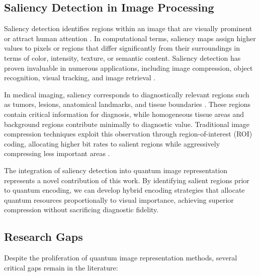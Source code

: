 \documentclass{ipol}
\begin{document}
\subsection{Saliency Detection in Image Processing}

Saliency detection identifies regions within an image that are visually prominent or attract human attention \cite{bib26,bib27,bib28,bib29,bib30,bib31}. In computational terms, saliency maps assign higher values to pixels or regions that differ significantly from their surroundings in terms of color, intensity, texture, or semantic content. Saliency detection has proven invaluable in numerous applications, including image compression, object recognition, visual tracking, and image retrieval \cite{bib32,bib33,bib34,bib35}.

In medical imaging, saliency corresponds to diagnostically relevant regions such as tumors, lesions, anatomical landmarks, and tissue boundaries \cite{bib36,bib37,bib38,bib39,bib40}. These regions contain critical information for diagnosis, while homogeneous tissue areas and background regions contribute minimally to diagnostic value. Traditional image compression techniques exploit this observation through region-of-interest (ROI) coding, allocating higher bit rates to salient regions while aggressively compressing less important areas \cite{bib41}.

The integration of saliency detection into quantum image representation represents a novel contribution of this work. By identifying salient regions prior to quantum encoding, we can develop hybrid encoding strategies that allocate quantum resources proportionally to visual importance, achieving superior compression without sacrificing diagnostic fidelity.

\subsection{Research Gaps}

Despite the proliferation of quantum image representation methods, several critical gaps remain in the literature:
\end{document}
